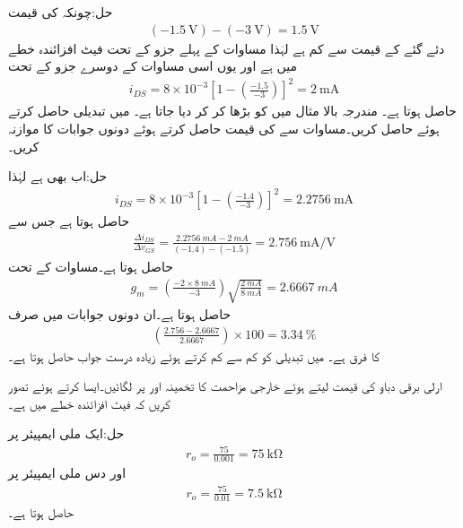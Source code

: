 حل:چونکہ  کی قیمت 
\begin{align*}
(\SI{-1.5}{\volt})-(\SI{-3}{\volt})=\SI{1.5}{\volt}
\end{align*}
دئے گئے  کے قیمت سے کم ہے لہٰذا مساوات  کے پہلے جزو کے تحت فیٹ افزائندہ خطے میں ہے اور یوں اسی مساوات کے دوسرے جزو کے تحت
\begin{align*}
i_{DS}=8 \times 10^{-3} \left[1-\left(\frac{-1.5}{-3} \right) \right]^2= \SI{2}{\milli \ampere}
\end{align*}
حاصل ہوتا ہے۔
مندرجہ بالا مثال میں  کو بڑھا کر   کر دیا جاتا ہے۔ میں تبدیلی حاصل کرتے ہوئے  حاصل کریں۔مساوات  سے  کی قیمت حاصل کرتے ہوئے دونوں جوابات کا موازنہ کریں۔

حل:اب بھی  ہے لہٰذا
\begin{align*}
i_{DS}=8 \times 10^{-3} \left[1-\left(\frac{-1.4}{-3} \right) \right]^2= \SI{2.2756}{\milli \ampere}
\end{align*}
حاصل ہوتا ہے جس سے
\begin{align*}
\frac{\Delta i_{DS}}{\Delta v_{GS}}=\frac{\SI{2.2756}{mA}-\SI{2}{mA}}{(-1.4)-(-1.5)}=\SI[per=frac,fraction=nice]{2.756}{\milli \ampere \per \volt}
\end{align*}
حاصل ہوتا ہے۔مساوات  کے تحت
\begin{align*}
g_m=\left(\frac{-2 \times \SI{8}{mA}}{-3} \right) \sqrt{\frac{\SI{2}{mA}}{\SI{8}{mA}}}=\SI{2.6667}{mA}
\end{align*} 
حاصل ہوتا ہے۔ان دونوں جوابات میں صرف
\begin{align*}
\left(\frac{2.756-2.6667}{2.6667} \right) \times 100=\SI{3.34}{\percent}
\end{align*}
کا فرق ہے۔ میں تبدیلی کو کم سے کم کرتے ہوئے زیادہ درست جواب حاصل ہوتا ہے۔  

ارلی برقی دباو  کی قیمت  لیتے ہوئے خارجی مزاحمت  کا تخمینہ  اور  پر لگائیں۔ایسا کرتے ہوئے تصور کریں کہ فیٹ افزائندہ خطے میں ہے۔

حل:ایک ملی ایمپیئر پر
\begin{align*}
r_o=\frac{75}{0.001}=\SI{75}{\kilo \ohm}
\end{align*}
اور دس ملی ایمپیئر پر
\begin{align*}
r_o=\frac{75}{0.01}=\SI{7.5}{\kilo \ohm}
\end{align*}
حاصل ہوتا ہے۔

